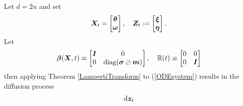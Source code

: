 \documentclass[11pt,twoside,a4paper]{article}
\begin{document}
\begin{proposition}
Let $d=2n$ and set 
\begin{align} \label{partitionvector}
     {\bm{X}}_t = \begin{bmatrix}{\bm{\theta}} \\ 
    {\bm{\omega}}
    \end{bmatrix}, \quad  {\bm{Z}}_t := \begin{bmatrix}
    {\bm{\xi}} \\
    {\bm{\eta}} 
    \end{bmatrix}.
\end{align}
Let 
\begin{align}
    {\bm{\beta}}({\bm{X}},t) \equiv   \begin{bmatrix}
    {\bm{I}} & 0 \\ 
    0 & \operatorname{diag}({\bm{\sigma}} \oslash {\bm{m}} )
    \end{bmatrix} ,
    \quad 
    \mathbb{R}(t) \equiv 
     \begin{bmatrix}
    0 & 0 \\ 
    0 & {\bm{I}}
    \end{bmatrix} 
\end{align}
then applying Theorem \ref{LampertiTransform} to (\ref{ODEsystem}) results in the diffusion process
\begin{align}
    {\rm{d}} {\bm{z}}_t
\end{align}
\end{proposition}
\end{document}
